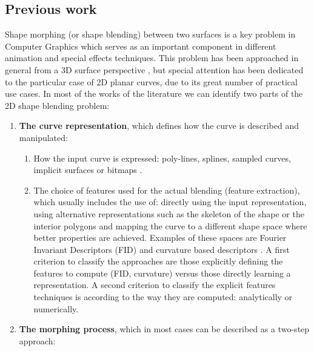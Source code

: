 \documentclass{ipol}
\begin{document}
\subsection{Previous work}
Shape morphing (or shape blending) between two surfaces is a key problem in Computer Graphics which serves as an important component in different animation and special effects techniques.
This problem has been approached in general from a 3D surface perspective \cite{math:computer_graphics:alexa:2000:as_rigid_as_possible_shape_interpolation}, but special attention has been dedicated to the particular case of 2D planar curves, due to its great number of practical use cases.
In most of the works of the literature we can identify two parts of the 2D shape blending problem: 
  
\begin{enumerate}
    \item \textbf{The curve representation}, which defines how the curve is described and manipulated:
        \begin{enumerate}
            \item How the input curve is expressed: poly-lines, splines, sampled curves, implicit surfaces or bitmaps .
            \item The choice of features used for the actual blending (feature extraction), which usually includes the use of:
            directly using the input representation, using alternative representations such as the skeleton of the shape \cite{math:computational_geometry:2006:comparison_of_numerical_techniques_for_euclidean_curvature} or the interior polygons and mapping the curve to a different shape space where better properties are achieved. Examples of these spaces are Fourier Invariant Descriptors (FID) \cite{math:computer_graphics:curve_blending:ghorbel:2020:fast_blending_of_planar_shapes} and curvature based descriptors \cite{im_proc:curve_interpolation:elber:07:metamorphosis_planar_parametric_curves} . A first criterion to classify the approaches are those explicitly defining the features to compute (FID, curvature) versus those directly learning a representation. A second criterion to classify the explicit features techniques is according to the way they are computed: analytically or numerically.
        \end{enumerate}
    \item \textbf{The morphing process}, which in most cases can be described as a two-step approach:
        \begin{enumerate}

\end{enumerate}
\end{enumerate}
\end{document}
